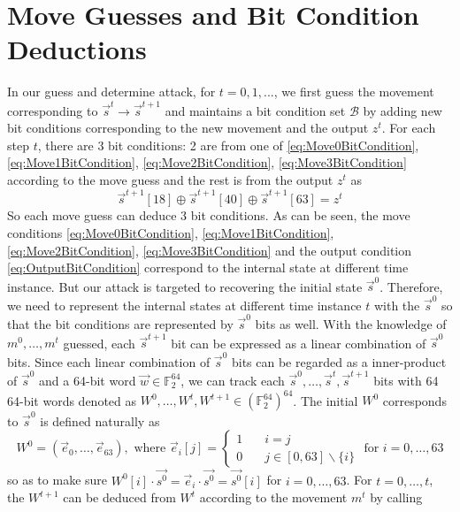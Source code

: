 \section{Move Guesses and Bit Condition Deductions}
In our guess and determine attack, for $t=0,1,...$, we first guess the movement corresponding to $\vec{s}^t\rightarrow \vec{s}^{t+1}$ and maintains a bit condition set $\mathcal{B}$ by adding new bit conditions corresponding to the new movement and the output $z^t$.
For each step $t$, there are 3 bit conditions: 2 are from one of \eqref{eq:Move0BitCondition}, \eqref{eq:Move1BitCondition}, \eqref{eq:Move2BitCondition}, \eqref{eq:Move3BitCondition} according to the move guess and the rest is from the output $z^t$ as
\begin{equation}\label{eq:OutputBitCondition}
\vec{s}^{t+1}[18]\oplus \vec{s}^{t+1}[40]\oplus \vec{s}^{t+1}[63]=z^t
\end{equation}
So each move guess can deduce 3 bit conditions.
As can be seen, the move conditions \eqref{eq:Move0BitCondition}, \eqref{eq:Move1BitCondition}, \eqref{eq:Move2BitCondition}, \eqref{eq:Move3BitCondition} and the output condition \eqref{eq:OutputBitCondition} correspond to the internal state at different time instance.
But our attack is targeted to recovering the initial state $\vec{s}^0$.
Therefore, we need to represent the internal states at different time instance $t$ with the $\vec{s}^0$ so that the bit conditions are represented by $\vec{s}^0$ bits as well.
With the knowledge of $m^0,\ldots, m^t$ guessed, each $\vec{s}^{t+1}$ bit can be expressed as a linear combination of $\vec{s}^0$ bits.
Since each linear combination of $\vec{s}^0$ bits can be regarded as a inner-product of $\vec{s}^0$ and a 64-bit word $\vec w\in \mathbb{F}_2^{64}$, we can track each $\vec{s}^0,\ldots, \vec{s}^t, \vec{s}^{t+1}$ bits with 64 64-bit words denoted as $W^0,\ldots, W^t, W^{t+1}\in (\mathbb{F}_2^{64})^{64}$.
The initial $W^0$ corresponds to $\vec{s}^0$ is defined naturally as
\begin{equation}\label{eq:W0ofS0}
  W^0=(\vec e_0, \ldots, \vec e_{63}), \text{ where } \vec e_i[j]=\left\{
  \begin{split}
     1 &\quad i=j \\
     0 &\quad j\in [0,63]\backslash\{i\}
  \end{split}
  \right.\text{ for }i=0,\ldots, 63
\end{equation}
so as to make sure $W^0[i]\cdot \vec{s^0}=\vec{e}_i\cdot \vec{s^0}=\vec{s^0}[i]$ for $i=0,\ldots, 63$.
For $t=0,\ldots, t$, the $W^{t+1}$ can be deduced from $W^t$ according to the movement $m^t$ by calling
